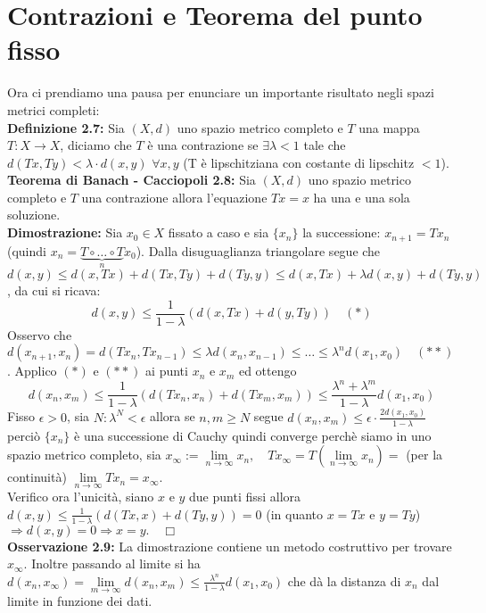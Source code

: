 \documentclass[a4paper,11pt,titlepage]{book}
\begin{document}
\section{Contrazioni e Teorema del punto fisso}

Ora ci prendiamo una pausa per enunciare un importante risultato negli spazi metrici completi:\\

\textbf{Definizione 2.7:} Sia $(X,d)$ uno spazio metrico completo e $T$ una mappa $T:X\to X$, diciamo che $T$ è una contrazione se $\exists\lambda<1$ tale che $d(Tx,Ty)<\lambda\cdot d(x,y)$ $\forall x,y$ (T è lipschitziana con costante di lipschitz $<1$).\\

\textbf{Teorema di Banach - Cacciopoli 2.8:} Sia $(X,d)$ uno spazio metrico completo e $T$ una contrazione allora l'equazione $Tx=x$ ha una e una sola soluzione.\\

\textbf{Dimostrazione:} Sia $x_0\in X$ fissato a caso e sia $\{x_n\}$ la successione: $x_{n+1}=Tx_n$ (quindi $x_n=\underbrace{ T\circ\ldots\circ T}_{n}x_0$). Dalla disuguaglianza triangolare segue che $d(x,y)\leq d(x,Tx)+d(Tx,Ty)+d(Ty,y)\leq d(x,Tx)+\lambda d(x,y)+d(Ty,y)$, da cui si ricava: $$d(x,y)\leq \frac{1}{1-\lambda}(d(x,Tx)+d(y,Ty))\quad(*)$$ Osservo che $d(x_{n+1},x_n)=d(Tx_n,Tx_{n-1})\leq \lambda d(x_n,x_{n-1})\leq \ldots \leq \lambda^n d(x_1,x_0)\quad(**)$. Applico $(*)$ e $(**)$ ai punti $x_n$ e $x_m$ ed ottengo $$d(x_n,x_m)\leq \frac{1}{1-\lambda}(d(Tx_n,x_n)+d(Tx_m,x_m))\leq \frac{\lambda^n + \lambda^m}{1-\lambda}d(x_1,x_0)$$ Fisso $\epsilon >0$, sia $N: \lambda^N<\epsilon$ allora se $n,m\geq N$ segue $d(x_n,x_m)\leq\epsilon\cdot\frac{2d(x_1,x_0)}{1-\lambda}$ perciò $\{x_n\}$ è una successione di Cauchy quindi converge perchè siamo in uno spazio metrico completo, sia $x_\infty := \lim\limits_{n\to\infty} x_n, \quad Tx_\infty=T(\lim\limits_{n\to\infty} x_n) =$ (per la continuità) $\lim\limits_{n\to\infty} Tx_n=x_\infty$.\\
Verifico ora l'unicità, siano $x$ e $y$ due punti fissi allora $d(x,y)\leq\frac{1}{1-\lambda}(d(Tx,x)+d(Ty,y))=0$ (in quanto $x=Tx$ e $y=Ty$) $\Rightarrow d(x,y)=0\Rightarrow x=y.\quad \Box$\\

\textbf{Osservazione 2.9:} La dimostrazione contiene un metodo costruttivo per trovare $x_\infty$. Inoltre passando al limite si ha $d(x_n,x_\infty)=\lim\limits_{m\to\infty}d(x_n,x_m)\leq\frac{ \lambda ^n}{1-\lambda}d(x_1,x_0)$ che dà la distanza di $x_n$ dal limite in funzione dei dati.\\
\end{document}
